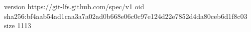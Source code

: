 version https://git-lfs.github.com/spec/v1
oid sha256:bf4aab54ad1caa3a7a02ad0b668e06c0c97e124d22e7852d4da80ceb6d1f8c03
size 1113
